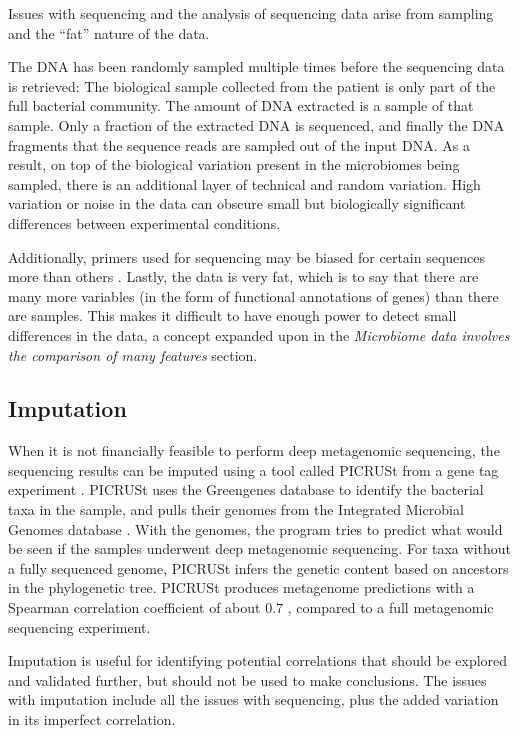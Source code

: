 Issues with sequencing and the analysis of sequencing data arise from sampling and the ``fat'' nature of the data.

The DNA has been randomly sampled multiple times before the sequencing data is retrieved: The biological sample collected from the patient is only part of the full bacterial community. The amount of DNA extracted is a sample of that sample. Only a fraction of the extracted DNA is sequenced, and finally the DNA fragments that the sequence reads are sampled out of the input DNA. As a result, on top of the biological variation present in the microbiomes being sampled, there is an additional layer of technical and random variation. High variation or noise in the data can obscure small but biologically significant differences between experimental conditions.

Additionally, primers used for sequencing may be biased for certain sequences more than others \cite{kanagawa2003bias}. Lastly, the data is very fat, which is to say that there are many more variables (in the form of functional annotations of genes) than there are samples. This makes it difficult to have enough power to detect small differences in the data, a concept expanded upon in the \textit{Microbiome data involves the comparison of many features} section.

\FloatBarrier

\subsection{Imputation}
When it is not financially feasible to perform deep metagenomic sequencing, the sequencing results can be imputed using a tool called PICRUSt from a gene tag experiment \cite{langille2013predictive}. PICRUSt uses the Greengenes database \cite{desantis2006greengenes} to identify the bacterial taxa in the sample, and pulls their genomes from the Integrated Microbial Genomes database \cite{markowitz2012img}. With the genomes, the program tries to predict what would be seen if the samples underwent deep metagenomic sequencing. For taxa without a fully sequenced genome, PICRUSt infers the genetic content based on ancestors in the phylogenetic tree. PICRUSt produces metagenome predictions with a Spearman correlation coefficient of about $0.7$ \cite{langille2013predictive}, compared to a full metagenomic sequencing experiment.

Imputation is useful for identifying potential correlations that should be explored and validated further, but should not be used to make conclusions. The issues with imputation include all the issues with sequencing, plus the added variation in its imperfect correlation.

